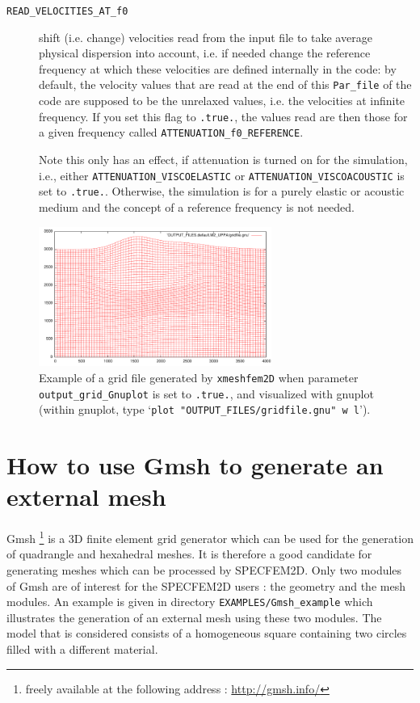 \begin{description}
\item[{\texttt{READ\_VELOCITIES\_AT\_f0}}]
 shift (i.e. change) velocities read from the input file to take average physical dispersion into account, i.e. if needed change the reference frequency at which these velocities are defined internally in the code: by default, the velocity values that are read at the end of this \texttt{Par\_file} of the code are supposed to be the unrelaxed values, i.e. the velocities at infinite frequency. If you set this flag to \texttt{.true.}, the values read are then those for a given frequency called \texttt{ATTENUATION\_f0\_REFERENCE}.

Note this only has an effect, if attenuation is turned on for the simulation, i.e., either \texttt{ATTENUATION\_VISCOELASTIC} or \texttt{ATTENUATION\_VISCOACOUSTIC} is set to \texttt{.true.}. Otherwise, the simulation is for a purely elastic or acoustic medium and the concept of a reference frequency is not needed.

\end{description}



\begin{figure}[htbp]
\centering
\includegraphics[width=3in]{figures/example-gridfile.pdf}
\caption{Example of a grid file generated by \texttt{xmeshfem2D} when parameter \texttt{output\_grid\_Gnuplot} is set to \texttt{.true.}, and visualized with gnuplot
(within gnuplot, type `\texttt{plot "OUTPUT\_FILES/gridfile.gnu" w l}').}
\label{fig:example.mesh}
\end{figure}


\section{How to use Gmsh to generate an external mesh}

Gmsh%
\footnote{freely available at the following address : \url{http://gmsh.info/}}
is a 3D finite element grid generator which can be used for the generation
of quadrangle and hexahedral meshes. It is therefore a good candidate
for generating meshes which can be processed by SPECFEM2D. Only two
modules of Gmsh are of interest for the SPECFEM2D users : the geometry
and the mesh modules. An example is given in directory \texttt{EXAMPLES/Gmsh\_example}
which illustrates the generation of an external mesh using these two
modules. The model that is considered consists of a homogeneous
square containing two circles filled with a different material.

